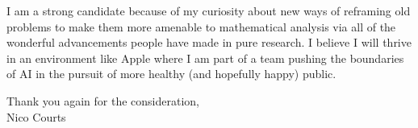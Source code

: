 \documentclass[12pt]{article} %
\begin{document}
I am a strong candidate because of my curiosity about new ways of reframing old problems 
to make them more amenable to mathematical analysis via all of the wonderful advancements
people have made in pure research. I believe I will thrive in an environment like Apple where
I am part of a team pushing the boundaries of AI in the pursuit of more healthy (and hopefully happy)
public.

\vspace{0.25in}Thank you again for the consideration,\hfill\\

Nico Courts
\end{document}
